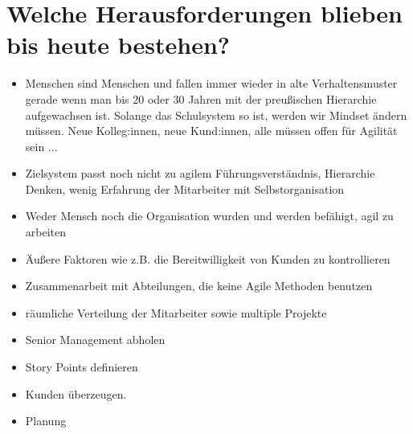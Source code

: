 \section*{Welche Herausforderungen blieben bis heute bestehen?}
\begin{itemize}
    \item[\openresponse] Menschen sind Menschen und fallen immer wieder in alte Verhaltensmuster gerade wenn man bis 20 oder 30 Jahren mit der preußischen Hierarchie aufgewachsen ist. Solange das Schulsystem so ist, werden wir Mindset ändern müssen. Neue Kolleg:innen, neue Kund:innen, alle müssen offen für Agilität sein ...
    \item[\openresponse] Zielsystem passt noch nicht zu agilem Führungsverständnis, Hierarchie Denken, wenig Erfahrung der Mitarbeiter mit Selbstorganisation
    \item[\openresponse] Weder Mensch noch die Organisation wurden und werden befähigt, agil zu arbeiten
    \item[\openresponse] Äußere Faktoren wie z.B. die Bereitwilligkeit von Kunden zu kontrollieren
    \item[\openresponse] Zusammenarbeit mit Abteilungen, die keine Agile Methoden benutzen
    \item[\openresponse] räumliche Verteilung der Mitarbeiter sowie multiple Projekte
    \item[\openresponse] Senior Management abholen
    \item[\openresponse] Story Points definieren
    \item[\openresponse] Kunden überzeugen.
    \item[\openresponse] Planung
\end{itemize}

